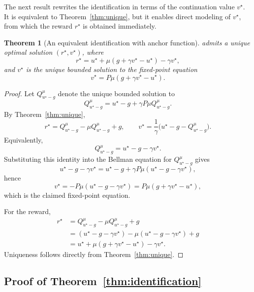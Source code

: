 \documentclass{article}
\newtheorem{theorem}{Theorem}
\newcommand{\1}{\mathbbm{1}}
\newcommand{\ustar}{u^\star}
\begin{document}
The next result rewrites the identification in terms of the continuation value
\(v^\star\). It is equivalent to Theorem~\ref{thm:unique}, but it enables direct
modeling of \(v^\star\), from which the reward \(r^\star\) is obtained
immediately.


\begin{theorem}[An equivalent identification with anchor function]
\label{thm:unique2}
 admits a unique optimal solution \((r^\star,v^\star)\), where
\[
r^\star
=
\ustar + \mu\!\left(g+\gamma v^\star-\ustar\right)-\gamma v^\star,
\]
and \(v^\star\) is the unique bounded solution to the fixed-point equation
\[
v^\star = P\mu\!\left(g+\gamma v^\star-\ustar\right).
\]
\end{theorem}

\begin{proof}
Let \(Q^\mu_{\ustar-g}\) denote the unique bounded solution to
\[
Q^\mu_{\ustar-g}
=
\ustar-g+\gamma P\mu Q^\mu_{\ustar-g}.
\]
By Theorem~\ref{thm:unique},
\[
r^\star
=
Q^\mu_{\ustar-g}-\mu Q^\mu_{\ustar-g}+g,
\qquad
v^\star
=
\frac{1}{\gamma}\bigl(\ustar-g-Q^\mu_{\ustar-g}\bigr).
\]
Equivalently,
\[
Q^\mu_{\ustar-g}=\ustar-g-\gamma v^\star.
\]
Substituting this identity into the Bellman equation for \(Q^\mu_{\ustar-g}\)
gives
\[
\ustar-g-\gamma v^\star
=
\ustar-g+\gamma P\mu(\ustar-g-\gamma v^\star),
\]
hence
\[
v^\star
=
-P\mu(\ustar-g-\gamma v^\star)
=
P\mu(g+\gamma v^\star-\ustar),
\]
which is the claimed fixed-point equation.

For the reward,
\begin{align*}
r^\star
&=
Q^\mu_{\ustar-g}-\mu Q^\mu_{\ustar-g}+g \\
&=
(\ustar-g-\gamma v^\star)-\mu(\ustar-g-\gamma v^\star)+g \\
&=
\ustar + \mu(g+\gamma v^\star-\ustar)-\gamma v^\star.
\end{align*}
Uniqueness follows directly from Theorem~\ref{thm:unique}.
\end{proof}


\subsection{Proof of Theorem~\ref{thm:identification}}
\end{document}
